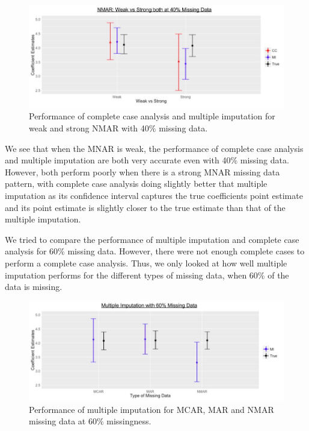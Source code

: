 \documentclass[fleqn,10pt]{wlscirep}\usepackage[]{graphicx}\usepackage[]{color}
\begin{document}
\begin{figure}[H]
\centering
\includegraphics[width=\linewidth]{nmar_weak_vs_strong}
\caption{Performance of complete case analysis and multiple imputation for weak and strong NMAR with 40\% missing data.}
\label{fig:nmar_weak_vs_strong}
\end{figure}

We see that when the MNAR is weak, the performance of complete case analysis and multiple imputation are both very accurate even with 40\% missing data. However, both perform poorly when there is a strong MNAR missing data pattern, with complete case analysis doing slightly better that multiple imputation as its confidence interval captures the true coefficients point estimate and its point estimate is slightly closer to the true estimate than that of the multiple imputation. 

We tried to compare the performance of multiple imputation and complete case analysis for 60\% missing data. However, there were not enough complete cases to perform a complete case analysis. Thus, we only looked at how well multiple imputation performs for the different types of missing data, when 60\% of the data is missing.     

\begin{figure}[H]
\centering
\includegraphics[width=\linewidth]{mi_60per_missing_plot}
\caption{Performance of multiple imputation for MCAR, MAR and NMAR missing data at 60\% missingness.}
\label{fig:mi_60per_missing_plot}
\end{figure}
\end{document}
